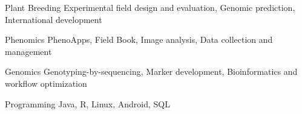 

\begin{cvskills}

  \cvskill
    {Plant Breeding} %
    {Experimental field design and evaluation, Genomic prediction, International development} %

  \cvskill
    {Phenomics} %
    {PhenoApps, Field Book, Image analysis, Data collection and management} %

  \cvskill
    {Genomics} %
    {Genotyping-by-sequencing, Marker development, Bioinformatics and workflow optimization} %

  \cvskill
    {Programming} %
    {Java, R, Linux, Android, SQL} %

\end{cvskills}
